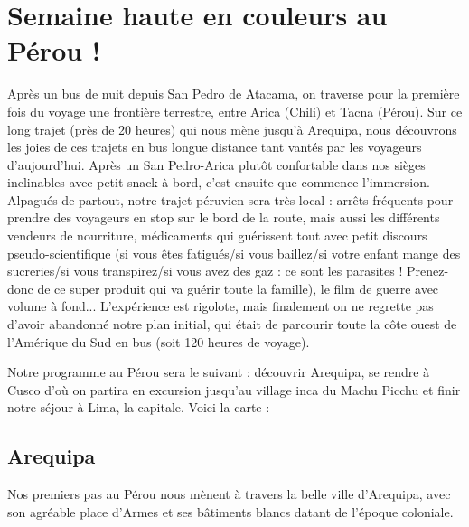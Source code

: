 \hypertarget{semaine-haute-en-couleurs-au-puxe9rou}{%
\section{Semaine haute en couleurs au Pérou
!}\label{semaine-haute-en-couleurs-au-puxe9rou}}

Après un bus de nuit depuis San Pedro de Atacama, on traverse pour la
première fois du voyage une frontière terrestre, entre Arica (Chili) et
Tacna (Pérou). Sur ce long trajet (près de 20 heures) qui nous mène
jusqu'à Arequipa, nous découvrons les joies de ces trajets en bus longue
distance tant vantés par les voyageurs d'aujourd'hui. Après un San
Pedro-Arica plutôt confortable dans nos sièges inclinables avec petit
snack à bord, c'est ensuite que commence l'immersion. Alpagués de
partout, notre trajet péruvien sera très local : arrêts fréquents pour
prendre des voyageurs en stop sur le bord de la route, mais aussi les
différents vendeurs de nourriture, médicaments qui guérissent tout avec
petit discours pseudo-scientifique (si vous êtes fatigués/si vous
baillez/si votre enfant mange des sucreries/si vous transpirez/si vous
avez des gaz : ce sont les parasites ! Prenez-donc de ce super produit
qui va guérir toute la famille), le film de guerre avec volume à fond...
L'expérience est rigolote, mais finalement on ne regrette pas d'avoir
abandonné notre plan initial, qui était de parcourir toute la côte ouest
de l'Amérique du Sud en bus (soit 120 heures de voyage).

Notre programme au Pérou sera le suivant : découvrir Arequipa, se rendre
à Cusco d'où on partira en excursion jusqu'au village inca du Machu
Picchu et finir notre séjour à Lima, la capitale. Voici la carte :

\hypertarget{mapid}{}

\hypertarget{arequipa}{%
\subsection{Arequipa}\label{arequipa}}

Nos premiers pas au Pérou nous mènent à travers la belle ville
d'Arequipa, avec son agréable place d'Armes et ses bâtiments blancs
datant de l'époque coloniale.

